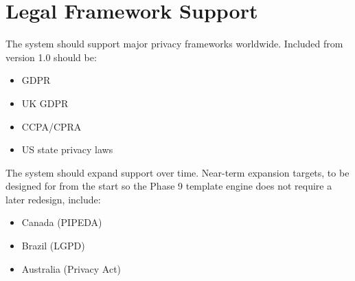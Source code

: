 
\chapter{Legal Framework Support}
The system should support major privacy frameworks worldwide.
Included from version 1.0 should be:
\begin{itemize}
	\item GDPR
	\item UK GDPR
	\item CCPA/CPRA
	\item US state privacy laws
\end{itemize}

The system should expand support over time. Near-term expansion targets, to be designed for from the start so the Phase 9 template engine does not require a later redesign, include:
\begin{itemize}
	\item Canada (PIPEDA)
	\item Brazil (LGPD)
	\item Australia (Privacy Act)
\end{itemize}

\sentinelchapterend
